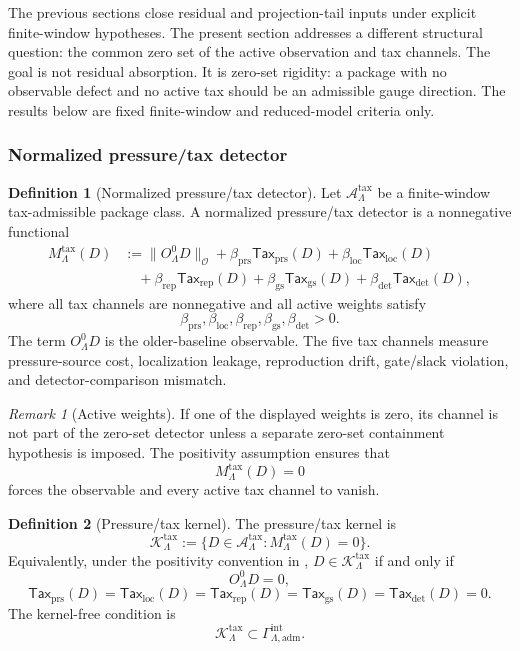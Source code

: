\documentclass[11pt]{article}
\numberwithin{equation}{section}
\theoremstyle{definition}
\newtheorem{definition}[definition]{Definition}
\theoremstyle{remark}
\newtheorem{remark}[remark]{Remark}
\newcommand{\adm}{\mathrm{adm}}
\newcommand{\detc}{\mathrm{det}}
\newcommand{\Tax}{\mathsf{Tax}}
\begin{document}
The previous sections close residual and projection-tail inputs under explicit
finite-window hypotheses.  The present section addresses a different structural
question: the common zero set of the active observation and tax channels.  The
goal is not residual absorption.  It is zero-set rigidity: a package with no
observable defect and no active tax should be an admissible gauge direction.
The results below are fixed finite-window and reduced-model criteria only.

\subsubsection{Normalized pressure/tax detector}

\begin{definition}[Normalized pressure/tax detector]
\label{def:tax-detector}
Let \(\mathcal A_{\Lambda}^{\mathrm{tax}}\) be a finite-window tax-admissible
package class.  A normalized pressure/tax detector is a nonnegative functional
\[
\begin{aligned}
    M_{\Lambda}^{\mathrm{tax}}(D)
    &:=
    \|O^0_{\Lambda}D\|_{\mathcal O}
    +
    \beta_{\mathrm{prs}}\Tax_{\mathrm{prs}}(D)
    +
    \beta_{\mathrm{loc}}\Tax_{\mathrm{loc}}(D)\\
    &\quad+
    \beta_{\mathrm{rep}}\Tax_{\mathrm{rep}}(D)
    +
    \beta_{\mathrm{gs}}\Tax_{\mathrm{gs}}(D)
    +
    \beta_{\detc}\Tax_{\detc}(D),
\end{aligned}
\]
where all tax channels are nonnegative and all active weights satisfy
\[
    \beta_{\mathrm{prs}},
    \beta_{\mathrm{loc}},
    \beta_{\mathrm{rep}},
    \beta_{\mathrm{gs}},
    \beta_{\detc}
    >
    0.
\]
The term \(O^0_{\Lambda}D\) is the older-baseline observable.  The five tax
channels measure pressure-source cost, localization leakage, reproduction
drift, gate/slack violation, and detector-comparison mismatch.
\end{definition}

\begin{remark}[Active weights]
If one of the displayed weights is zero, its channel is not part of the
zero-set detector unless a separate zero-set containment hypothesis is imposed.
The positivity assumption ensures that
\[
    M_{\Lambda}^{\mathrm{tax}}(D)=0
\]
forces the observable and every active tax channel to vanish.
\end{remark}

\begin{definition}[Pressure/tax kernel]
\label{def:tax-kernel}
The pressure/tax kernel is
\[
    \mathcal K_{\Lambda}^{\mathrm{tax}}
    :=
    \{D\in\mathcal A_{\Lambda}^{\mathrm{tax}}:
    M_{\Lambda}^{\mathrm{tax}}(D)=0\}.
\]
Equivalently, under the positivity convention in ,
\(D\in\mathcal K_{\Lambda}^{\mathrm{tax}}\) if and only if
\[
    O^0_{\Lambda}D=0,
\]
\[
    \Tax_{\mathrm{prs}}(D)=
    \Tax_{\mathrm{loc}}(D)=
    \Tax_{\mathrm{rep}}(D)=
    \Tax_{\mathrm{gs}}(D)=
    \Tax_{\detc}(D)=0.
\]
The kernel-free condition is
\[
    \mathcal K_{\Lambda}^{\mathrm{tax}}
    \subset
    \Gamma_{\Lambda,\adm}^{\mathrm{int}}.
\]
\end{definition}
\end{document}
